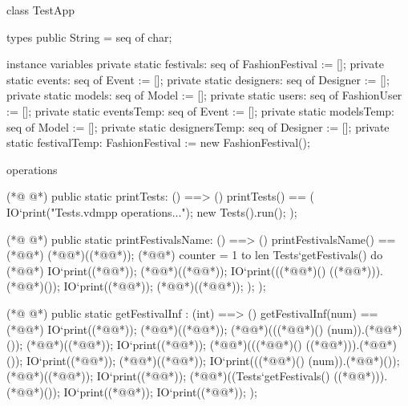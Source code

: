 \begin{vdmpp}[breaklines=true]
class TestApp

types
public String = seq of char;

instance variables
private  static festivals: seq of FashionFestival := [];
private  static events: seq of Event := [];
private  static designers: seq of Designer := [];
private  static models: seq of Model := [];
private  static users: seq of FashionUser := [];
private static eventsTemp: seq of Event := [];
private static modelsTemp: seq of Model := [];
private static designersTemp: seq of Designer := [];
private static festivalTemp: FashionFestival := new FashionFestival();

operations

(*@
\label{printTests:19}
@*)
public static printTests: () ==> ()
 printTests() == 
 (
  IO`print("\nExecuting Tests.vdmpp operations...\n");
    new Tests().run();   
   );
   
  
(*@
\label{printFestivalsName:27}
@*)
  public static printFestivalsName: () ==> ()
 printFestivalsName() ==
 (*@\vdmnotcovered{(}@*) 
 (*@@*)((*@@*));
 (*@@*) counter = 1 to len Tests`getFestivals() do (*@\vdmnotcovered{(}@*)
    IO`print((*@@*));
    (*@@*)((*@@*));
    IO`print(((*@@*)() ((*@@*))).(*@@*)());
    IO`print((*@@*));
    (*@@*)((*@@*));
   );
  );   
  
   
(*@
\label{getFestivalInf:41}
@*)
 public static getFestivalInf : (int) ==> ()
  getFestivalInf(num) == (*@\vdmnotcovered{(}@*)
      IO`print((*@@*));
    (*@@*)((*@@*));
    (*@@*)(((*@@*)() (num)).(*@@*)());
    (*@@*)((*@@*));
    IO`print((*@@*));
    (*@@*)(((*@@*)() ((*@@*))).(*@@*)());
    IO`print((*@@*));
    (*@@*)((*@@*));
    IO`print(((*@@*)() (num)).(*@@*)());
    (*@@*)((*@@*));
    IO`print((*@@*));
    (*@@*)((Tests`getFestivals() ((*@@*))).(*@@*)());
    IO`print((*@@*));
    IO`print((*@@*));
  );
  


\end{vdmpp}
